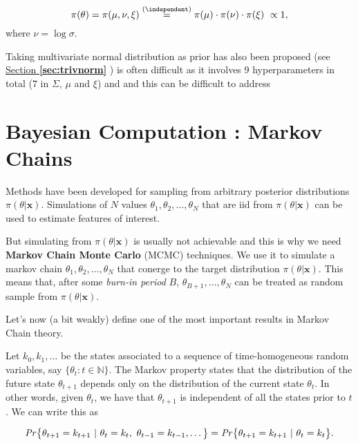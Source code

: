 \begin{equation}
\pi(\theta)=\pi(\mu,\nu,\xi)\stackrel{(\independent)}{=}\pi(\mu)\cdot\pi(\nu)\cdot\pi(\xi)\ \propto 1,
\end{equation}
where $\nu= \log\sigma$.

Taking multivariate normal distribution as prior has also been proposed (see \hyperref[sec:trivnorm]{Section \textbf{\ref{sec:trivnorm}}} ) is often difficult as it involves 9 hyperparameters in total ($7$ in $\Sigma$, $\mu$ and $\xi$) and  and this can be difficult to address





\section{Bayesian Computation : Markov Chains}\label{sec:baymcmc}


Methods have been developed for sampling from arbitrary posterior distributions $\pi(\theta|\boldsymbol{x})$. Simulations of $N$ values $\theta_1,\theta_2,\dots,\theta_N$ that are iid from $\pi(\theta|\boldsymbol{x})$ can be used to estimate features of interest.

But simulating from $\pi(\theta|\boldsymbol{x})$ is usually not achievable and this is why we need \textbf{Markov Chain Monte Carlo} (MCMC) techniques. 
We use it to simulate a markov chain $\theta_1,\theta_2,\dots,\theta_N$ that conerge to the target distribution $\pi(\theta|\boldsymbol{x})$.
This means that, after some \emph{burn-in period} $B$, $\theta_{B+1},\dots,\theta_N$ can be treated as random sample from $\pi(\theta|\boldsymbol{x})$.


Let's now (a bit weakly) define one of the most important results in Markov Chain theory.

\begin{definition}
	Let $k_0,k_1,\dots$ be the states associated to a sequence of time-homogeneous random variables, say $\big\{\theta_t:t\in\mathbb{N}\big\}$.
	The Markov property states that the distribution of the future state $\theta_{t+1}$ depends only on the distribution of the current state $\theta_{t}$. 
	In other words, given $\theta_{t}$, we have that $\theta_{t+1}$ is independent of all the states prior to $t$. We can write this as
	
	\begin{equation}
	\text{\emph{Pr}}\big\{\theta_{t+1}=k_{t+1}\ |\ \theta_t=k_t,\ \theta_{t-1}=k_{t-1},\dots\big\} = \text{\emph{Pr}}\big\{\theta_{t+1}=k_{t+1}\ | \ \theta_t=k_t\big\}.
	\end{equation}
\end{definition} 

